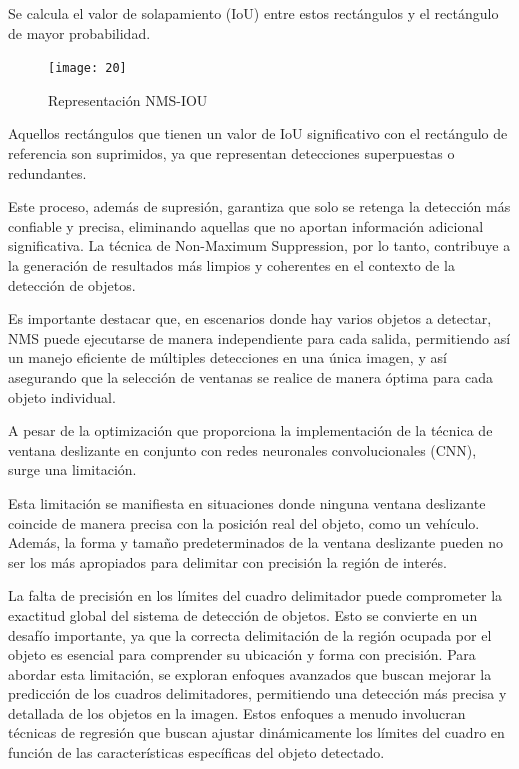 	Se calcula el valor de solapamiento (IoU) entre estos rectángulos y el rectángulo de mayor probabilidad. 


	\begin{figure} 
		\centering
		\texttt{[image: 20]}
		\caption{Representación NMS-IOU}
	\end{figure}

    Aquellos rectángulos que tienen un valor de IoU significativo con el rectángulo de referencia son suprimidos, ya que representan detecciones superpuestas o redundantes. 
    
    Este proceso, además de supresión, garantiza que solo se retenga la detección más confiable y precisa, eliminando aquellas que no aportan información adicional significativa. La técnica de Non-Maximum Suppression, por lo tanto, contribuye a la generación de resultados más limpios y coherentes en el contexto de la detección de objetos.

    
    Es importante destacar que, en escenarios donde hay varios objetos a detectar, NMS puede ejecutarse de manera independiente para cada salida, permitiendo así un manejo eficiente de múltiples detecciones en una única imagen, y así asegurando que la selección de ventanas se realice de manera óptima para cada objeto individual.	
 	
	A pesar de la optimización que proporciona la implementación de la técnica de ventana deslizante en conjunto con redes neuronales convolucionales (CNN), surge una limitación.

	Esta limitación se manifiesta en situaciones donde ninguna ventana deslizante coincide de manera precisa con la posición real del objeto, como un vehículo. Además, la forma y tamaño predeterminados de la ventana deslizante pueden no ser los más apropiados para delimitar con precisión la región de interés.
	
	La falta de precisión en los límites del cuadro delimitador puede comprometer la exactitud global del sistema de detección de objetos. Esto se convierte en un desafío importante, ya que la correcta delimitación de la región ocupada por el objeto es esencial para comprender su ubicación y forma con precisión.
	Para abordar esta limitación, se exploran enfoques avanzados que buscan mejorar la predicción de los cuadros delimitadores, permitiendo una detección más precisa y detallada de los objetos en la imagen. Estos enfoques a menudo involucran técnicas de regresión que buscan ajustar dinámicamente los límites del cuadro en función de las características específicas del objeto detectado.

